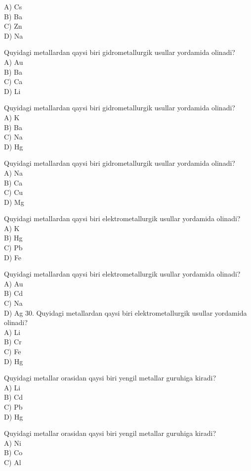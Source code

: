 A) Cs\\
B) Ba\\
C) Zn\\
D) Na
  \item Quyidagi metallardan qaysi biri gidrometallurgik usullar yordamida olinadi?\\
A) Au\\
B) Ba\\
C) Ca\\
D) Li
  \item Quyidagi metallardan qaysi biri gidrometallurgik usullar yordamida olinadi?\\
A) K\\
B) Ba\\
C) Na\\
D) Hg
  \item Quyidagi metallardan qaysi biri gidrometallurgik usullar yordamida olinadi?\\
A) Na\\
B) Ca\\
C) Cu\\
D) Mg
  \item Quyidagi metallardan qaysi biri elektrometallurgik usullar yordamida olinadi?\\
A) K\\
B) Hg\\
C) Pb\\
D) Fe
  \item Quyidagi metallardan qaysi biri elektrometallurgik usullar yordamida olinadi?\\
A) Au\\
B) Cd\\
C) Na\\
D) Ag
30. Quyidagi metallardan qaysi biri elektrometallurgik usullar yordamida olinadi?\\
A) Li\\
B) Cr\\
C) Fe\\
D) Hg
  \item Quyidagi metallar orasidan qaysi biri yengil metallar guruhiga kiradi?\\
A) Li\\
B) Cd\\
C) Pb\\
D) Hg
  \item Quyidagi metallar orasidan qaysi biri yengil metallar guruhiga kiradi?\\
A) Ni\\
B) Co\\
C) Al\\

